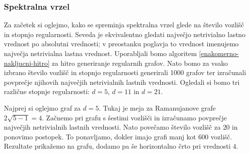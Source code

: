 \subsubsection{Spektralna vrzel}
Za začetek si oglejmo, kako se spreminja spektralna vrzel glede na število vozlišč in stopnjo regularnosti. Seveda je ekvivalentno gledati največjo netrivialno lastno vrednost po absolutni vrednosti; v preostanku poglavja to vrednost imenujemo največja netrivialna lastna vrednost. Uporabljali bomo algoritem \ref{enakomerno-nakljucni-hitro} za hitro generiranje regularnih grafov. Nato bomo za vsako izbrano število vozlišč in stopnjo regularnosti generirali 1000 grafov ter izračunali povprečje njihovih največjih netrivialnih lastnih vrednosti. Ogledali si bomo tri različne stopnje regularnosti: \(d=5\), \(d=11\) in \(d=21\).

Najprej si oglejmo graf za \(d=5\). Tukaj je meja za Ramanujanove grafe \(2\sqrt{5-1} = 4\). Začnemo pri grafu s šestimi vozlišči in izračunamo povprečje največjih netrivialnih lastnih vrednosti. Nato povečamo število vozlišč za \(20\) in ponovimo postopek. To ponavljamo, dokler imajo grafi manj kot \(600\) vozlišč. Rezultate prikažemo na grafu, dodamo pa še horizontalno črto pri vrednosti \(4\).

